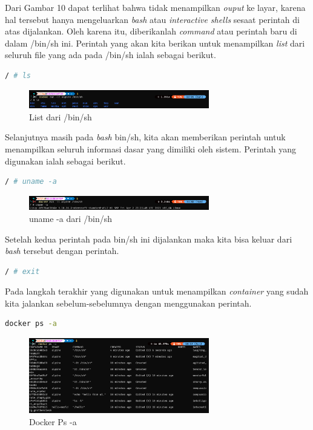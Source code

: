 \documentclass[11pt,a4paper]{article}
\begin{document}
    Dari Gambar 10 dapat terlihat bahwa tidak menampilkan \textit{ouput} ke layar, karena hal tersebut hanya 
    mengeluarkan \textit{bash} atau \textit{interactive shells} sesaat perintah di atas dijalankan. Oleh karena itu, 
    diberikanlah \textit{command} atau perintah baru di dalam /bin/sh ini. Perintah yang akan kita berikan untuk menampilkan 
    \textit{list} dari seluruh file yang ada pada /bin/sh ialah sebagai berikut.
    \begin{lstlisting}[language=bash]
        / # ls
    \end{lstlisting}
    \begin{figure}[h]
        \centering
        \includegraphics[width = 0.7\textwidth]{Figures/list.png}
        \caption{List dari /bin/sh}
    \end{figure}
    Selanjutnya masih pada \textit{bash} bin/sh, kita akan memberikan perintah untuk menampilkan seluruh informasi dasar 
    yang dimiliki oleh sistem. Perintah yang digunakan ialah sebagai berikut.
    \begin{lstlisting}[language=bash]
        / # uname -a
    \end{lstlisting}
    \begin{figure}[h]
        \centering
        \includegraphics[width = 0.7\textwidth]{Figures/uname -a.png}
        \caption{uname -a dari /bin/sh}
    \end{figure}
    \newpage
    Setelah kedua perintah pada bin/sh ini dijalankan maka kita bisa keluar dari \textit{bash} tersebut dengan perintah.
    \begin{lstlisting}[language=bash]
        / # exit
    \end{lstlisting}
    Pada langkah terakhir yang digunakan untuk menampilkan \textit{container} yang sudah kita jalankan sebelum-sebelumnya 
    dengan menggunakan perintah.
    \begin{lstlisting}[language=bash]
        docker ps -a
    \end{lstlisting}

    \begin{figure}[h]
        \centering
        \includegraphics[width = 0.7\textwidth]{Figures/docker ps-a.png}
        \caption{Docker Ps -a}
    \end{figure}
\end{document}
